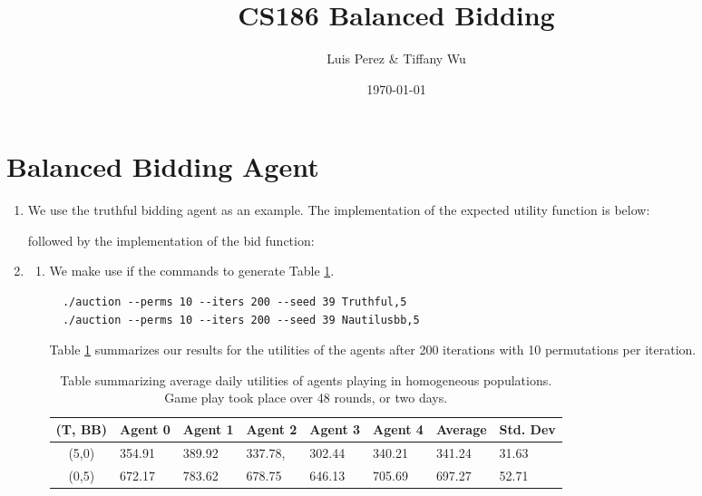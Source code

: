 \documentclass[11pt]{article}
\title{CS186 Balanced Bidding}
\author{Luis Perez \& Tiffany Wu}
\date{\today}
\begin{document}
\maketitle

\section*{Balanced Bidding Agent}
\begin{enumerate}
\item We use the truthful bidding agent as an example. The  implementation of the expected utility function is below:

  

  followed by the implementation of the bid function:

  
\item 
  \begin{enumerate}
  \item  We make use if the commands to generate Table \ref{tab:bb_tt}.
  \begin{lstlisting}
  ./auction --perms 10 --iters 200 --seed 39 Truthful,5
  ./auction --perms 10 --iters 200 --seed 39 Nautilusbb,5
  \end{lstlisting}
  Table \ref{tab:bb_tt} summarizes our results for the utilities of the agents after 200 iterations with 10 permutations per iteration.
    
    \begin{table}[!h]
      \centering
        \begin{tabular}{clllllll}
        \hline
        (T, BB) & Agent 0 & Agent 1 & Agent 2 & Agent 3 & Agent 4 & Average & Std. Dev     \\ \hline
        (5,0)   & 354.91 & 389.92 & 337.78, & 302.44 & 340.21 & 341.24 & 31.63 \\
        (0,5)   & 672.17   & 783.62  & 678.75  & 646.13  & 705.69 & 697.27 & 52.71 \\ \hline
        \end{tabular}
        \caption{Table summarizing average daily utilities of agents playing in homogeneous populations. Game play took place over 48 rounds, or two days.}
        \label{tab:bb_tt}
      \end{table}


\end{enumerate}
\end{enumerate}
\end{document}
